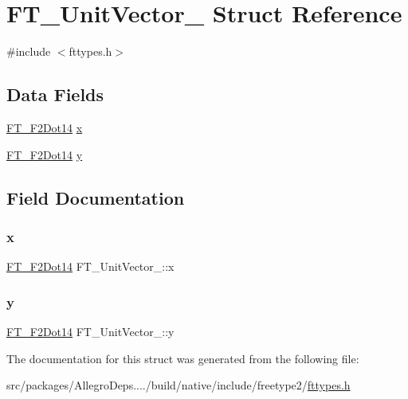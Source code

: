 \hypertarget{struct_f_t___unit_vector__}{}\section{F\+T\+\_\+\+Unit\+Vector\+\_\+ Struct Reference}
\label{struct_f_t___unit_vector__}


{\ttfamily \#include $<$fttypes.\+h$>$}

\subsection*{Data Fields}
\begin{DoxyCompactItemize}
\item 
\hyperlink{fttypes_8h_a430d070e946e531a607ae350e822ffca}{F\+T\+\_\+\+F2\+Dot14} \hyperlink{struct_f_t___unit_vector___a03c9f8ae35a5ad1bcac49995a9dac714}{x}
\item 
\hyperlink{fttypes_8h_a430d070e946e531a607ae350e822ffca}{F\+T\+\_\+\+F2\+Dot14} \hyperlink{struct_f_t___unit_vector___a12eb9ad5c47614f5f2d3f9e401933d0e}{y}
\end{DoxyCompactItemize}


\subsection{Field Documentation}
\mbox{\label{struct_f_t___unit_vector___a03c9f8ae35a5ad1bcac49995a9dac714}} 
\subsubsection{\texorpdfstring{x}{x}}
{\footnotesize\ttfamily \hyperlink{fttypes_8h_a430d070e946e531a607ae350e822ffca}{F\+T\+\_\+\+F2\+Dot14} F\+T\+\_\+\+Unit\+Vector\+\_\+\+::x}

\mbox{\label{struct_f_t___unit_vector___a12eb9ad5c47614f5f2d3f9e401933d0e}} 
\subsubsection{\texorpdfstring{y}{y}}
{\footnotesize\ttfamily \hyperlink{fttypes_8h_a430d070e946e531a607ae350e822ffca}{F\+T\+\_\+\+F2\+Dot14} F\+T\+\_\+\+Unit\+Vector\+\_\+\+::y}



The documentation for this struct was generated from the following file\+:\begin{DoxyCompactItemize}
\item 
src/packages/\+Allegro\+Deps..../build/native/include/freetype2/\hyperlink{fttypes_8h}{fttypes.\+h}\end{DoxyCompactItemize}
